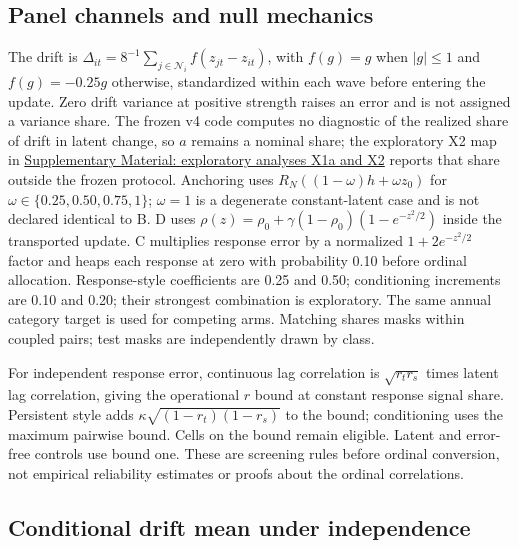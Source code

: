 
\subsection*{Panel channels and null mechanics}

The drift is $\Delta_{it}=8^{-1}\sum_{j\in\mathcal N_i}f(z_{jt}-z_{it})$, with $f(g)=g$ when $|g|\leq1$ and $f(g)=-0.25g$ otherwise, standardized within each wave before entering the update. Zero drift variance at positive strength raises an error and is not assigned a variance share. The frozen v4 code computes no diagnostic of the realized share of drift in latent change, so $a$ remains a nominal share; the exploratory X2 map in \hyperref[supp:x1-x2]{Supplementary Material: exploratory analyses X1a and X2} reports that share outside the frozen protocol. Anchoring uses $R_N((1-\omega)h+\omega z_0)$ for $\omega\in\{0.25,0.50,0.75,1\}$; $\omega=1$ is a degenerate constant-latent case and is not declared identical to B. D uses $\rho(z)=\rho_0+\gamma(1-\rho_0)(1-e^{-z^2/2})$ inside the transported update. C multiplies response error by a normalized $1+2e^{-z^2/2}$ factor and heaps each response at zero with probability 0.10 before ordinal allocation. Response-style coefficients are 0.25 and 0.50; conditioning increments are 0.10 and 0.20; their strongest combination is exploratory. The same annual category target is used for competing arms. Matching shares masks within coupled pairs; test masks are independently drawn by class.

For independent response error, continuous lag correlation is $\sqrt{r_t r_s}$ times latent lag correlation, giving the operational $r$ bound at constant response signal share. Persistent style adds $\kappa\sqrt{(1-r_t)(1-r_s)}$ to the bound; conditioning uses the maximum pairwise bound. Cells on the bound remain eligible. Latent and error-free controls use bound one. These are screening rules before ordinal conversion, not empirical reliability estimates or proofs about the ordinal correlations.

\subsection*{Conditional drift mean under independence}\label{supp:drift-mean}

